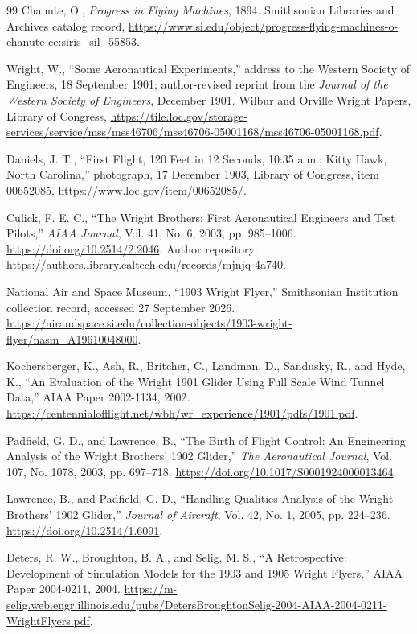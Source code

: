 \begin{thebibliography}{99}
 Chanute, O., \emph{Progress in Flying Machines}, 1894. Smithsonian Libraries and Archives catalog record, \url{https://www.si.edu/object/progress-flying-machines-o-chanute-ce:siris_sil_55853}.

 Wright, W., ``Some Aeronautical Experiments,'' address to the Western Society of Engineers, 18 September 1901; author-revised reprint from the \emph{Journal of the Western Society of Engineers}, December 1901. Wilbur and Orville Wright Papers, Library of Congress, \url{https://tile.loc.gov/storage-services/service/mss/mss46706/mss46706-05001168/mss46706-05001168.pdf}.

 Daniels, J. T., ``First Flight, 120 Feet in 12 Seconds, 10:35 a.m.; Kitty Hawk, North Carolina,'' photograph, 17 December 1903, Library of Congress, item 00652085, \url{https://www.loc.gov/item/00652085/}.

 Culick, F. E. C., ``The Wright Brothers: First Aeronautical Engineers and Test Pilots,'' \emph{AIAA Journal}, Vol. 41, No. 6, 2003, pp. 985--1006. \url{https://doi.org/10.2514/2.2046}. Author repository: \url{https://authors.library.caltech.edu/records/mjnjq-4a740}.

 National Air and Space Museum, ``1903 Wright Flyer,'' Smithsonian Institution collection record, accessed 27 September 2026. \url{https://airandspace.si.edu/collection-objects/1903-wright-flyer/nasm_A19610048000}.

 Kochersberger, K., Ash, R., Britcher, C., Landman, D., Sandusky, R., and Hyde, K., ``An Evaluation of the Wright 1901 Glider Using Full Scale Wind Tunnel Data,'' AIAA Paper 2002-1134, 2002. \url{https://centennialofflight.net/wbh/wr_experience/1901/pdfs/1901.pdf}.

 Padfield, G. D., and Lawrence, B., ``The Birth of Flight Control: An Engineering Analysis of the Wright Brothers' 1902 Glider,'' \emph{The Aeronautical Journal}, Vol. 107, No. 1078, 2003, pp. 697--718. \url{https://doi.org/10.1017/S0001924000013464}.

 Lawrence, B., and Padfield, G. D., ``Handling-Qualities Analysis of the Wright Brothers' 1902 Glider,'' \emph{Journal of Aircraft}, Vol. 42, No. 1, 2005, pp. 224--236. \url{https://doi.org/10.2514/1.6091}.

 Deters, R. W., Broughton, B. A., and Selig, M. S., ``A Retrospective: Development of Simulation Models for the 1903 and 1905 Wright Flyers,'' AIAA Paper 2004-0211, 2004. \url{https://m-selig.web.engr.illinois.edu/pubs/DetersBroughtonSelig-2004-AIAA-2004-0211-WrightFlyers.pdf}.


\end{thebibliography}
